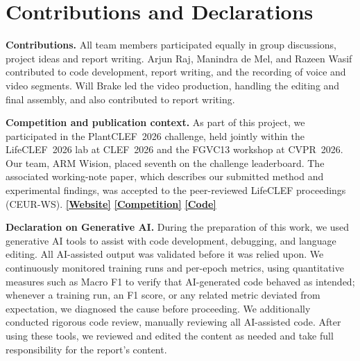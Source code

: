 \chapter*{Contributions and Declarations}

\textbf{Contributions.} All team members participated equally in group discussions, project ideas and report writing. Arjun Raj, Manindra de Mel, and Razeen Wasif contributed to code development, report writing, and the recording of voice and video segments. Will Brake led the video production, handling the editing and final assembly, and also contributed to report writing.

\textbf{Competition and publication context.} As part of this project, we participated in the PlantCLEF~2026 challenge, held jointly within the LifeCLEF~2026 lab at CLEF~2026 and the FGVC13 workshop at CVPR~2026. Our team, ARM Wision, placed seventh on the challenge leaderboard. The associated working-note paper, which describes our submitted method and experimental findings, was accepted to the peer-reviewed LifeCLEF proceedings (CEUR-WS).
\href{https://arm-wision.github.io/}{\textbf{[Website]}}
\href{https://www.kaggle.com/competitions/plantclef-2026/leaderboard}{\textbf{[Competition]}}
\href{https://github.com/arm-wision/PlantCLEF2026}{\textbf{[Code]}}

\textbf{Declaration on Generative AI.}
During the preparation of this work, we used generative AI tools to
assist with code development, debugging, and language editing. All AI-assisted
output was validated before it was relied upon. We continuously monitored
training runs and per-epoch metrics, using quantitative measures such as
Macro F1 to verify that AI-generated code behaved as intended; whenever
a training run, an F1 score, or any related metric deviated from expectation, we
diagnosed the cause before proceeding. We additionally conducted rigorous code
review, manually reviewing all AI-assisted code. After using these tools, we
reviewed and edited the content as needed and take full responsibility
for the report's content.
